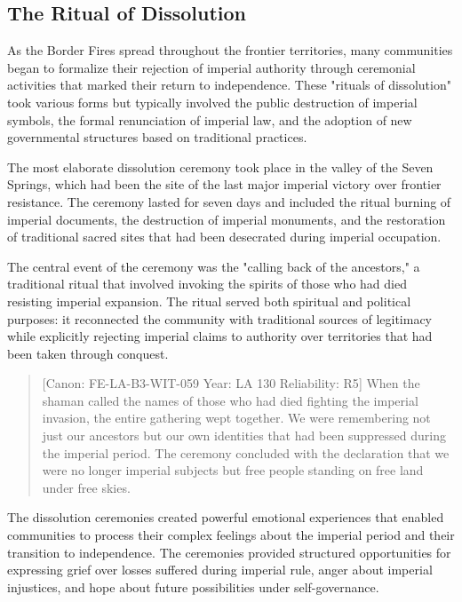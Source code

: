 \subsection{The Ritual of Dissolution}\label{the-ritual-of-dissolution}

As the Border Fires spread throughout the frontier territories, many
communities began to formalize their rejection of imperial authority
through ceremonial activities that marked their return to independence.
These "rituals of dissolution" took various forms but typically involved
the public destruction of imperial symbols, the formal renunciation of
imperial law, and the adoption of new governmental structures based on
traditional practices.

The most elaborate dissolution ceremony took place in the valley of the
Seven Springs, which had been the site of the last major imperial
victory over frontier resistance. The ceremony lasted for seven days and
included the ritual burning of imperial documents, the destruction of
imperial monuments, and the restoration of traditional sacred sites that
had been desecrated during imperial occupation.

The central event of the ceremony was the "calling back of the
ancestors," a traditional ritual that involved invoking the spirits of
those who had died resisting imperial expansion. The ritual served both
spiritual and political purposes: it reconnected the community with
traditional sources of legitimacy while explicitly rejecting imperial
claims to authority over territories that had been taken through
conquest.

\begin{quote}
{[}Canon: FE-LA-B3-WIT-059 \textbar{} Year: LA 130 \textbar{}
Reliability: R5{]} When the shaman called the names of those who had
died fighting the imperial invasion, the entire gathering wept together.
We were remembering not just our ancestors but our own identities that
had been suppressed during the imperial period. The ceremony concluded
with the declaration that we were no longer imperial subjects but free
people standing on free land under free skies.
\end{quote}

The dissolution ceremonies created powerful emotional experiences that
enabled communities to process their complex feelings about the imperial
period and their transition to independence. The ceremonies provided
structured opportunities for expressing grief over losses suffered
during imperial rule, anger about imperial injustices, and hope about
future possibilities under self-governance.

